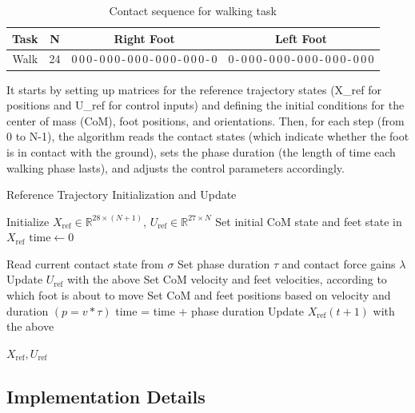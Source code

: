 \documentclass[main.tex]{subfiles}
\begin{document}
\begin{table}[H]
\centering
\caption{Contact sequence for walking task}
\label{tab:cs_walk}
\begin{tabular}{|c|c|c|c|}
\hline
\textbf{Task} & \textbf{N} & \textbf{Right Foot} & \textbf{Left Foot} \\
\hline
Walk & 24 & 0\,0\,0\,-\,0\,0\,0\,-\,0\,0\,0\,-\,0\,0\,0\,-\,0\,0\,0\,-\,0 & 0\,-\,0\,0\,0\,-\,0\,0\,0\,-\,0\,0\,0\,-\,0\,0\,0\,-\,0\,0\,0 \\
\hline
\end{tabular}
\end{table}

It starts by setting up matrices for the reference trajectory states (X\_ref for positions and U\_ref for control inputs) and defining the initial conditions for the center of mass (CoM), foot positions, and orientations. Then, for each step (from 0 to N-1), the algorithm reads the contact states (which indicate whether the foot is in contact with the ground), sets the phase duration (the length of time each walking phase lasts), and adjusts the control parameters accordingly.
\begin{algorithm}[H]
    \caption{Reference Trajectory Initialization and Update}
    \begin{algorithmic}[1]
    \State Initialize $X_{\text{ref}} \in \mathbb{R}^{28 \times (N+1)}$, $U_{\text{ref}} \in \mathbb{R}^{27 \times N}$
    \State Set initial CoM state and feet state in $X_{\text{ref}}$
    \State $\text{time} \gets 0$
    
        \State Read current contact state from $\sigma$
        \State Set phase duration $\tau$ and contact force gains $\lambda$
        \State Update $U_{\text{ref}}$ with the above
        \State Set CoM velocity and feet velocities, according to which foot is about to move
        \State Set CoM and feet positions based on velocity and duration $(p = v*\tau)$
        \State time = time + phase duration
        \State Update $X_{\text{ref}}(t+1)$ with the above
    \EndFor
    
    \State \Return $X_{\text{ref}}, U_{\text{ref}}$
    \end{algorithmic}
    \end{algorithm}

\subsection{Implementation Details}
\end{document}
